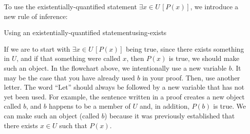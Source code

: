 \documentclass{book}
\theoremstyle{ekimcustom}
\begin{document}
To use the existentially-quantified statement $\exists x \in U\,[P(x)]$, we introduce a new rule of inference:
\begin{bmethod}{Using an existentially-quantified statement}{using-exists}
\begin{center}
\end{center}
\end{bmethod}
If we are to start with $\exists x \in U\,[P(x)]$ being true, since there exists something in $U$, and if that something were called $x$, then $P(x)$ is true, we should make such an object. In the flowchart above, we intentionally use a new variable $b$. It may be the case that you have already used $b$ in your proof. Then, use another letter. The word ``Let'' should always be followed by a new variable that has not yet been used. For example, the sentence  written in a proof creates a new object called $b$, and $b$ happens to be a member of $U$ and, in addition, $P(b)$ is true. We can make such an object (called $b$) because it was previously established that there exists $x \in U$ such that $P(x)$.
\end{document}
